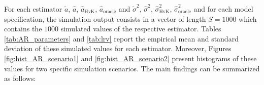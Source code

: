 For each estimator $\widetilde{a}$, $\widehat{a}$, $\widehat{a}_{\text{HvK}}$, $\widehat{a}_{\text{oracle}}$ and $\widetilde{\sigma}^2$, $\widehat{\sigma}^2$, $\widehat{\sigma}^2_{\text{HvK}}$, $\widehat{\sigma}^2_{\text{oracle}}$ and for each model specification, the simulation output consists in a vector of length $S=1000$ which contains the $1000$ simulated values of the respective estimator. 
Tables \ref{tab:AR_parameters} and \ref{tab:lrv} report the empirical mean and standard deviation of these simulated values for each estimator. 
Moreover, Figures \ref{fig:hist_AR_scenario1} and \ref{fig:hist_AR_scenario2} present histograms of these values for two specific simulation scenarios. The main findings can be summarized as follows: 
